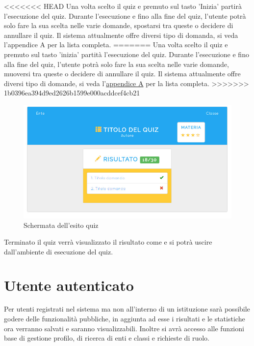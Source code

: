 \documentclass[a4paper, titlepage]{article}
\begin{document}
<<<<<<< HEAD
	 Una volta scelto il quiz e premuto sul tasto 'Inizia' partirà l'esecuzione del quiz. Durante l'esecuzione e fino alla fine del quiz, l'utente potrà solo fare la sua scelta nelle varie domande, spostarsi tra queste o decidere di annullare il quiz. Il sistema attualmente offre diversi tipo di domanda, si veda l'appendice A per la lista completa.
=======
	 Una volta scelto il quiz e premuto sul tasto 'inizia' partità l'esecuzione del quiz. Durante l'esecuzione e fino alla fine del quiz, l'utente potrà solo fare la sua scelta nelle varie domande, muoversi tra queste o decidere di annullare il quiz. Il sistema attualmente offre diversi tipo di domande, si veda l'\hyperref[domande]{appendice A} per la lista completa.
>>>>>>> 1b0396ea394d9ed2626b1599e000acddcef4cb21
	 
	 \newpage
	 \begin{figure}[!h]
	 	\centering
	 	\includegraphics[scale=0.33]{Img/screen_EsitoQuiz.png}
	 	\caption{Schermata dell'esito quiz}
	 \end{figure}
	 Terminato il quiz verrà visualizzato il risultato come
	  e si potrà uscire dall'ambiente di esecuzione del quiz.
	 
	 \newpage
	 \section{Utente autenticato}
	 Per utenti registrati nel sistema ma non all'interno di un istituzione sarà possibile godere delle funzionalità pubbliche, in aggiunta ad esse i risultati e le statistiche ora verranno salvati e saranno visualizzabili. Inoltre si avrà accesso alle funzioni base di gestione profilo, di ricerca di enti e classi e richieste di ruolo.
\end{document}
